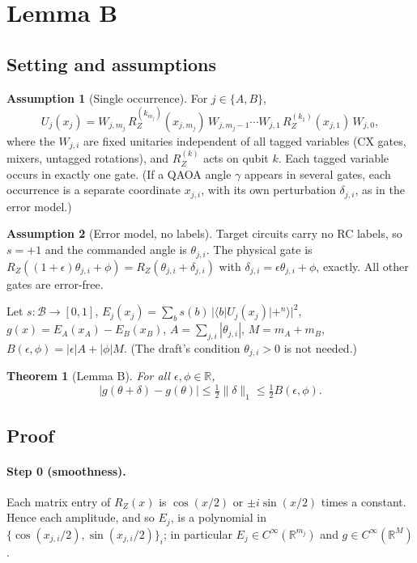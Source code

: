 \documentclass[11pt,a4paper]{article}
\newtheorem{theorem}{Theorem}
\theoremstyle{definition}
\newtheorem{assumption}{Assumption}
\theoremstyle{remark}
\newcommand{\R}{\mathbb{R}}
\newcommand{\B}{\mathcal{B}}
\newcommand{\eps}{\epsilon}
\newcommand{\RZ}{R_Z}
\begin{document}
\section{Lemma B}

\subsection{Setting and assumptions}
\begin{assumption}[Single occurrence]\label{A:single}
For $j\in\{A,B\}$,
\[U_j(x_j)=W_{j,m_j}\,\RZ^{(k_{m_j})}(x_{j,m_j})\,W_{j,m_j-1}\cdots
W_{j,1}\,\RZ^{(k_1)}(x_{j,1})\,W_{j,0},\]
where the $W_{j,i}$ are fixed unitaries
independent of all tagged variables (CX gates, mixers, untagged rotations), and
$\RZ^{(k)}$ acts on qubit $k$. Each tagged variable occurs in exactly one gate.
(If a QAOA angle $\gamma$ appears in several gates, each occurrence is a separate
coordinate $x_{j,i}$, with its own perturbation $\delta_{j,i}$, as in the error model.)
\end{assumption}
\begin{assumption}[Error model, no labels]\label{A:err}
Target circuits carry no RC labels, so $s=+1$ and the commanded angle is $\theta_{j,i}$.
The physical gate is $\RZ((1+\eps)\theta_{j,i}+\phi)=\RZ(\theta_{j,i}+\delta_{j,i})$
with $\delta_{j,i}=\eps\theta_{j,i}+\phi$, exactly. All other gates are error-free.
\end{assumption}
Let $s:\B\to[0,1]$,
$E_j(x_j)=\sum_bs(b)\,|\langle b|U_j(x_j)|{+}^n\rangle|^2$,
$g(x)=E_A(x_A)-E_B(x_B)$, $A=\sum_{j,i}|\theta_{j,i}|$, $M=m_A+m_B$,
$B(\eps,\phi)=|\eps|A+|\phi|M$. (The draft's condition $\theta_{j,i}>0$ is not needed.)

\begin{theorem}[Lemma B]\label{thm:B}
For all $\eps,\phi\in\R$,
\[|g(\theta+\delta)-g(\theta)|\le\tfrac12\|\delta\|_1\le\tfrac12B(\eps,\phi).\]
\end{theorem}

\subsection{Proof}
\paragraph{Step 0 (smoothness).} Each matrix entry of $\RZ(x)$ is $\cos(x/2)$ or
$\pm i\sin(x/2)$ times a constant. Hence each amplitude, and so $E_j$, is a polynomial in
$\{\cos(x_{j,i}/2),\sin(x_{j,i}/2)\}_i$; in particular $E_j\in C^\infty(\R^{m_j})$ and
$g\in C^\infty(\R^{M})$.
\end{document}
